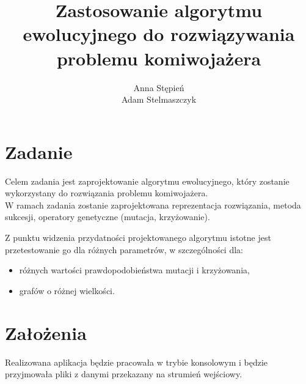 \documentclass[12pt, a4paper]{article}
\title{\textbf{Zastosowanie algorytmu ewolucyjnego do rozwiązywania problemu komiwojażera}}
\author{Anna Stępień \\ Adam Stelmaszczyk}
\date{}
\begin{document}
\maketitle

\section{Zadanie}
Celem zadania jest zaprojektowanie algorytmu ewolucyjnego, który zostanie wykorzystany do rozwiązania problemu komiwojażera. \\

W ramach zadania zostanie zaprojektowana reprezentacja rozwiązania, metoda sukcesji, operatory genetyczne (mutacja, krzyżowanie).

Z punktu widzenia przydatności projektowanego algorytmu istotne jest przetestowanie go dla różnych parametrów, w szczególności dla:
\begin{itemize}
	\item różnych wartości prawdopodobieństwa mutacji i krzyżowania,
	\item grafów o różnej wielkości.
\end{itemize}

\section{Założenia}
Realizowana aplikacja będzie pracowała w trybie konsolowym i będzie przyjmowała
pliki z danymi przekazany na strumień wejściowy.

\nocite{*}


\end{document}
